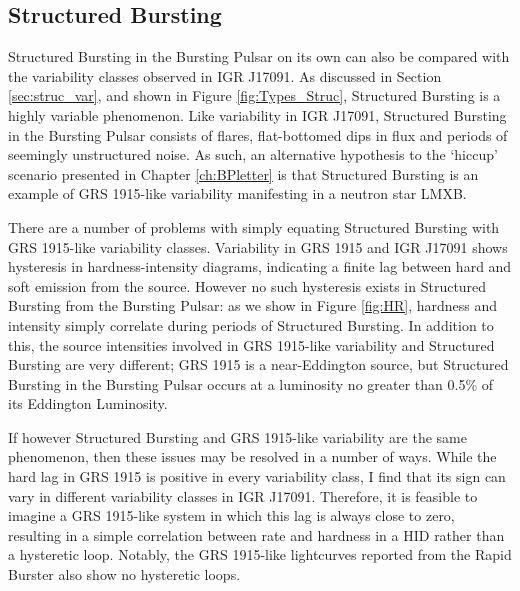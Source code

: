\subsection{Structured Bursting}

\par Structured Bursting in the Bursting Pulsar on its own can also be compared with the variability classes observed in IGR J17091.  As discussed in Section \ref{sec:struc_var}, and shown in Figure \ref{fig:Types_Struc}, Structured Bursting is a highly variable phenomenon.  Like variability in IGR J17091, Structured Bursting in the Bursting Pulsar consists of flares, flat-bottomed dips in flux and periods of seemingly unstructured noise.  As such, an alternative hypothesis to the `hiccup' scenario presented in Chapter \ref{ch:BPletter} is that Structured Bursting is an example of GRS 1915-like variability manifesting in a neutron star LMXB.
\par There are a number of problems with simply equating Structured Bursting with GRS 1915-like variability classes.  Variability in GRS 1915 and IGR J17091 shows hysteresis in hardness-intensity diagrams, indicating a finite lag between hard and soft emission from the source.  However no such hysteresis exists in Structured Bursting from the Bursting Pulsar: as we show in Figure \ref{fig:HR}, hardness and intensity simply correlate during periods of Structured Bursting.  In addition to this, the source intensities involved in GRS 1915-like variability and Structured Bursting are very different; GRS 1915 is a near-Eddington source, but Structured Bursting in the Bursting Pulsar occurs at a luminosity no greater than 0.5\% of its Eddington Luminosity.
\par If however Structured Bursting and GRS 1915-like variability are the same phenomenon, then these issues may be resolved in a number of ways.  While the hard lag in GRS 1915 is positive in every variability class, I find that its sign can vary in different variability classes in IGR J17091.  Therefore, it is feasible to imagine a GRS 1915-like system in which this lag is always close to zero, resulting in a simple correlation between rate and hardness in a HID rather than a hysteretic loop.  Notably, the GRS 1915-like lightcurves reported from the Rapid Burster \citep{Bagnoli_RB} also show no hysteretic loops.
